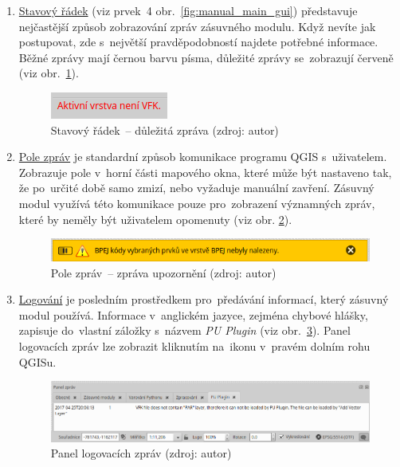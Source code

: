 \begin{enumerate}[leftmargin=1.5cm, noitemsep]
	\item \underline{Stavový řádek} (viz prvek~4
obr.~\ref{fig:manual_main_gui}) představuje nejčastější způsob
zobrazování zpráv zásuvného modulu. Když nevíte jak postupovat, zde
s~největší pravděpodobností najdete potřebné informace. Běžné zprávy
mají černou barvu písma, důležité zprávy se~zobrazují červeně (viz
obr.~\ref{fig:manual_dulezita_zprava}).
	
	\begin{figure}[H] \centering
		\includegraphics[width=.23\textwidth]{./pictures/statusbar-red_message.png}
		\caption[Stavový řádek~– důležitá zpráva]{Stavový
řádek~– důležitá zpráva (zdroj: autor)}
		\label{fig:manual_dulezita_zprava}
 	\end{figure}

	\item \underline{Pole zpráv} je standardní způsob komunikace
programu QGIS s~uživatelem. Zobrazuje pole v~horní části
mapového okna, které může být nastaveno tak, že po~určité době samo
zmizí, nebo vyžaduje manuální zavření. Zásuvný modul využívá této
komunikace pouze pro~zobrazení významných zpráv, které by neměly být
uživatelem opomenuty (viz obr. \ref{fig:manual_zprava_pole_zprav}).

	\begin{figure}[H] \centering
		\includegraphics[width=.7\textwidth]{./pictures/message_bar-message.png}
		\caption[Pole zpráv~– zpráva upozornění]{Pole zpráv~–
zpráva upozornění (zdroj: autor)}
		\label{fig:manual_zprava_pole_zprav}
 	\end{figure}

	\item \underline{Logování} je posledním prostředkem
pro~předávání informací, který zásuvný modul používá. Informace
v~anglickém jazyce, zejména chybové hlášky, zapisuje do~vlastní
záložky s~názvem \textit{PU Plugin} (viz
obr.~\ref{fig:manual_logovaci_panel}). Panel logovacích zpráv lze
zobrazit kliknutím na~ikonu  v~pravém dolním
rohu QGISu.

	\begin{figure}[H] \centering
		\includegraphics[width=1.0\textwidth]{./pictures/log_panel.png}
		\caption[Panel logovacích zpráv]{Panel logovacích
zpráv (zdroj: autor)}
		\label{fig:manual_logovaci_panel}
 	\end{figure}

\end{enumerate}

